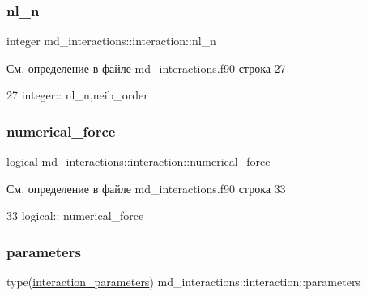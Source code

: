 \subsubsection{\texorpdfstring{nl\+\_\+n}{nl\_n}}
{\footnotesize\ttfamily integer md\+\_\+interactions\+::interaction\+::nl\+\_\+n}



См. определение в файле md\+\_\+interactions.\+f90 строка 27


\begin{DoxyCode}
27     \textcolor{keywordtype}{integer}:: nl\_n,neib\_order
\end{DoxyCode}
\mbox{\label{structmd__interactions_1_1interaction_a54ce703312ec9215da8f704c0134814b}} 
\subsubsection{\texorpdfstring{numerical\+\_\+force}{numerical\_force}}
{\footnotesize\ttfamily logical md\+\_\+interactions\+::interaction\+::numerical\+\_\+force}



См. определение в файле md\+\_\+interactions.\+f90 строка 33


\begin{DoxyCode}
33     \textcolor{keywordtype}{logical}:: numerical\_force
\end{DoxyCode}
\mbox{\label{structmd__interactions_1_1interaction_ab2041dbe838781954511d4738535fa98}} 
\subsubsection{\texorpdfstring{parameters}{parameters}}
{\footnotesize\ttfamily type(\mbox{\hyperlink{structmd__interactions_1_1interaction__parameters}{interaction\+\_\+parameters}}) md\+\_\+interactions\+::interaction\+::parameters}



